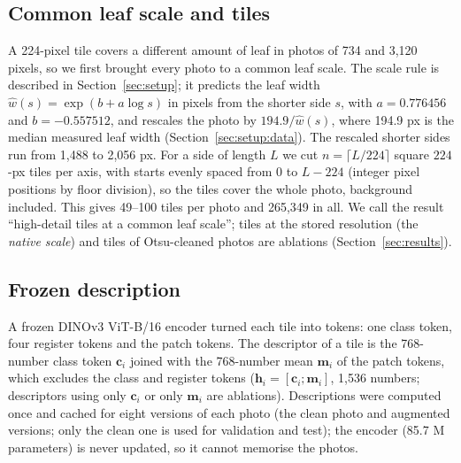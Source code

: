 \subsection{Common leaf scale and tiles}
A 224-pixel tile covers a different amount of leaf in photos of 734 and 3,120 pixels, so we first brought every photo to a
common leaf scale. The scale rule is described in Section~\ref{sec:setup}; it predicts the leaf width
$\hat w(s)=\exp(b+a\log s)$ in pixels from the shorter side $s$, with $a=0.776456$ and $b=-0.557512$, and rescales the photo
by $194.9/\hat w(s)$, where 194.9 px is the median measured leaf width (Section~\ref{sec:setup:data}). The rescaled shorter sides run from 1,488 to
2,056 px. For a side of length $L$ we cut $n=\lceil L/224\rceil$ square $224$-px tiles per axis, with starts evenly spaced
from $0$ to $L-224$ (integer pixel positions by floor division), so the tiles cover the whole photo, background
included. This gives 49--100 tiles per photo and 265{,}349 in all. We call the result ``high-detail tiles at a common
leaf scale''; tiles at the stored resolution (the \emph{native scale}) and tiles of Otsu-cleaned photos are ablations
(Section~\ref{sec:results}).

\subsection{Frozen description}
A frozen DINOv3 ViT-B/16 encoder \cite{simeoni2025dinov3} turned each tile into tokens: one class token, four register
tokens \cite{darcet2024registers} and the patch tokens. The descriptor of a tile is the 768-number class token $\mathbf c_i$
joined with the 768-number mean $\mathbf m_i$ of the patch tokens, which excludes the class and register tokens
($\mathbf h_i=[\mathbf c_i;\mathbf m_i]$, 1{,}536 numbers; descriptors using only $\mathbf c_i$ or only $\mathbf m_i$ are
ablations). Descriptions were computed once and cached for eight versions of each photo (the clean photo and augmented versions;
only the clean one is used for validation and test); the encoder (85.7 M parameters) is never updated, so it cannot memorise the photos.

